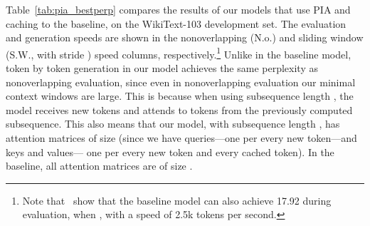 \documentclass[11pt,a4paper]{article}
\begin{document}
Table~\ref{tab:pia_bestperp} compares the results of our models that use PIA and caching to the baseline, on the WikiText-103 development set. The evaluation and generation speeds are shown in the nonoverlapping (N.o.) and sliding window (S.W., with stride ) speed columns, respectively.\footnote{Note that~\citet{baevski} show that the baseline model can also achieve 17.92 during evaluation, when , with a speed of 2.5k tokens per second.}
Unlike in the baseline model, token by token generation in our model achieves the same perplexity as nonoverlapping evaluation, since even in nonoverlapping evaluation our minimal context windows are large.
This is because when using subsequence length , the model receives  new tokens and attends to  tokens from the previously computed subsequence. 
This also means that our model, with subsequence length , has attention matrices of size  (since we have  queries---one per every new token---and  keys and  values--- one per every new token and every cached token). In the baseline, all attention matrices are of size . 
\end{document}
